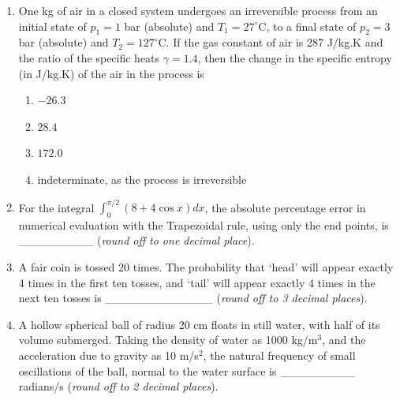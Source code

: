 \documentclass[12pt,onecolumn]{article}
\begin{document}
\begin{enumerate}
    \item One kg of air in a closed system undergoes an irreversible process from an initial state of $p_1 = 1$ bar (absolute) and $T_1 = 27^\circ$C, to a final state of $p_2 = 3$ bar (absolute) and $T_2 = 127^\circ$C. If the gas constant of air is 287 J/kg.K and the ratio of the specific heats $\gamma = 1.4$, then the change in the specific entropy (in J/kg.K) of the air in the process is
          \begin{enumerate}
              \item $-26.3$
              \item $28.4$
              \item $172.0$
              \item indeterminate, as the process is irreversible
          \end{enumerate}

    \item For the integral $\int_0^{\pi/2} (8 + 4\cos x) dx$, the absolute percentage error in numerical evaluation with the Trapezoidal rule, using only the end points, is \_\_\_\_\_\_\_\_\_ (\textit{round off to one decimal place}).

    \item A fair coin is tossed 20 times. The probability that `head' will appear exactly 4 times in the first ten tosses, and `tail' will appear exactly 4 times in the next ten tosses is \_\_\_\_\_\_\_\_\_\_\_\_\_ (\textit{round off to 3 decimal places}).

    \item A hollow spherical ball of radius 20 cm floats in still water, with half of its volume submerged. Taking the density of water as 1000 kg/m$^3$, and the acceleration due to gravity as 10 m/s$^2$, the natural frequency of small oscillations of the ball, normal to the water surface is \_\_\_\_\_\_\_\_\_ radians/s (\textit{round off to 2 decimal places}).


\end{enumerate}
\end{document}

